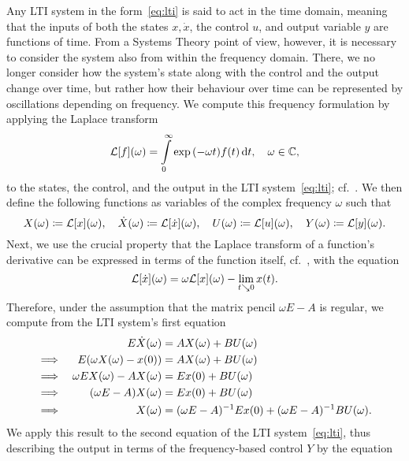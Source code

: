Any \ac{LTI} system in the form~\eqref{eq:lti} is said to act in the time domain, meaning that the inputs of both the states $x, \dot{x}$, the control $u$, and output variable $y$ are functions of time.
From a Systems Theory point of view, however, it is necessary to consider the system also from within the frequency domain.
There, we no longer consider how the system's state along with the control and the output change over time, but rather how their behaviour over time can be represented by oscillations depending on frequency.
We compute this frequency formulation by applying the Laplace transform
\begin{equation*}
    \mathcal{L}[f](\omega) = \int\limits_0^\infty \exp{(- \omega t)} f(t) \mathop{}\!\mathrm{d} t,\quad \omega \in \mathbb{C},
\end{equation*}
to the states, the control, and the output in the \ac{LTI} system~\eqref{eq:lti}; cf.~\cite{Arendt2011}.
We then define the following functions as variables of the complex frequency $\omega$ such that
\begin{equation}
    X(\omega) \coloneqq \mathcal{L}[x](\omega),\quad \dot{X}(\omega) \coloneqq \mathcal{L}[\dot{x}](\omega),\quad U(\omega) \coloneqq \mathcal{L}[u](\omega),\quad Y(\omega) \coloneqq \mathcal{L}[y](\omega).
\end{equation}
Next, we use the crucial property that the Laplace transform of a function's derivative can be expressed in terms of the function itself, cf.~\cite[Theorem~9.1]{Doetsch1974}, with the equation
\begin{equation*}
    \mathcal{L}[\dot{x}](\omega) = \omega \mathcal{L}[x](\omega) - \lim\limits_{t \searrow 0} x(t).
\end{equation*}
Therefore, under the assumption that the matrix pencil $\omega E - A$ is regular, we compute from the \ac{LTI} system's first equation
\begin{alignat*}{3}
     & & E \dot{X}(\omega) &= A X(\omega) + B U(\omega) \\
    \implies & & E (\omega X(\omega) - x(0)) &= A X(\omega) + B U(\omega) \\
    \implies & & \omega E X(\omega) - A X(\omega) &= E x(0) + B U(\omega) \\
    \implies & & (\omega E - A) X(\omega) &= E x(0) + B U(\omega) \\
    \implies & & X(\omega) &= (\omega E - A)\inv E x(0) + (\omega E - A)\inv B U(\omega).
\end{alignat*}
We apply this result to the second equation of the \ac{LTI} system~\eqref{eq:lti}, thus describing the output in terms of the frequency-based control $Y$ by the equation
